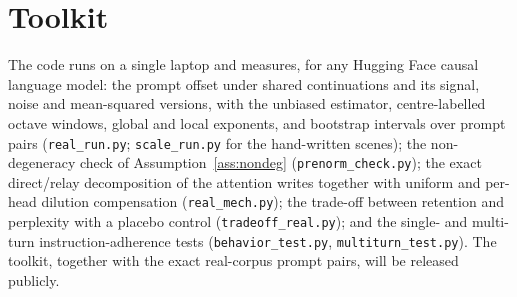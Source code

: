 \documentclass[11pt]{article}
\theoremstyle{definition}
\theoremstyle{remark}
\begin{document}
\section{Toolkit}
The code runs on a single laptop and measures, for any Hugging Face causal language model: the prompt offset under shared continuations and its signal, noise and mean-squared versions, with the unbiased estimator, centre-labelled octave windows, global and local exponents, and bootstrap intervals over prompt pairs (\texttt{real\_run.py}; \texttt{scale\_run.py} for the hand-written scenes); the non-degeneracy check of Assumption~\ref{ass:nondeg} (\texttt{prenorm\_check.py}); the exact direct/relay decomposition of the attention writes together with uniform and per-head dilution compensation (\texttt{real\_mech.py}); the trade-off between retention and perplexity with a placebo control (\texttt{tradeoff\_real.py}); and the single- and multi-turn instruction-adherence tests (\texttt{behavior\_test.py}, \texttt{multiturn\_test.py}). The toolkit, together with the exact real-corpus prompt pairs, will be released publicly.
\end{document}
